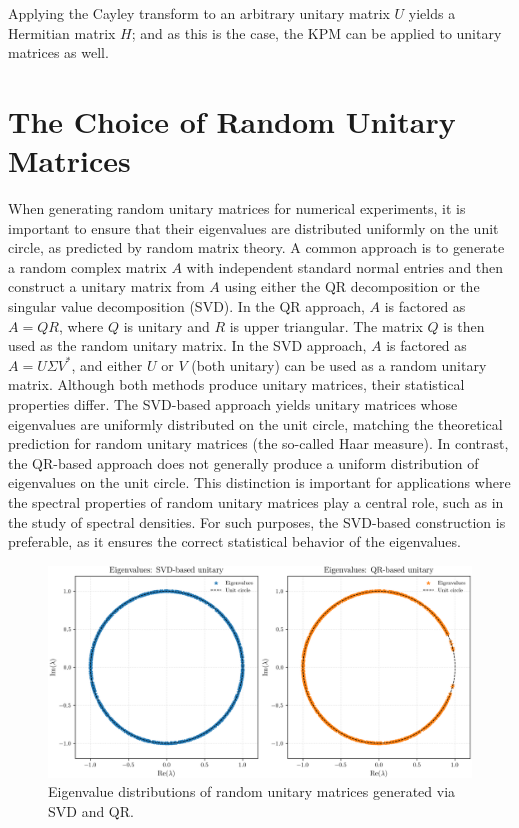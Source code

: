 Applying the Cayley transform to an arbitrary unitary matrix $U$ yields a Hermitian matrix $H$;
and as this is the case, the KPM can be applied to unitary matrices as well.

\section{The Choice of Random Unitary Matrices}

When generating random unitary matrices for numerical experiments,
it is important to ensure that their eigenvalues are distributed uniformly on the unit circle,
as predicted by random matrix theory.
A common approach is to generate a random complex matrix $A$ with independent standard normal entries
and then construct a unitary matrix from $A$ using either the QR decomposition or the singular value decomposition (SVD).
In the QR approach, $A$ is factored as $A = QR$, where $Q$ is unitary and $R$ is upper triangular.
The matrix $Q$ is then used as the random unitary matrix.
In the SVD approach, $A$ is factored as $A = U \Sigma V^*$,
and either $U$ or $V$ (both unitary) can be used as a random unitary matrix.
Although both methods produce unitary matrices, their statistical properties differ.
The SVD-based approach yields unitary matrices whose eigenvalues are uniformly distributed on the unit circle,
matching the theoretical prediction for random unitary matrices (the so-called Haar measure).
In contrast, the QR-based approach does not generally produce a uniform distribution of eigenvalues on the unit circle.
This distinction is important for applications where the spectral properties of random unitary matrices play a central role,
such as in the study of spectral densities.
For such purposes, the SVD-based construction is preferable,
as it ensures the correct statistical behavior of the eigenvalues.

\begin{figure}[htb]
    \centering
    \includegraphics[width=1\textwidth]{Graphics/eigenvalue_comparison.png}
    \caption{Eigenvalue distributions of random unitary matrices generated via SVD and QR.}
    \label{fig:eigenvalue-comparison}
\end{figure}